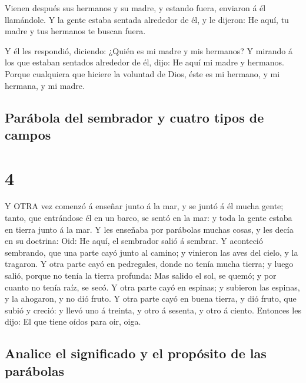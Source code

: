  Vienen después sus hermanos y su madre, y estando fuera,
enviaron á él llamándole.  Y la gente estaba sentada
alrededor de él, y le dijeron: He aquí, tu madre y tus hermanos te
buscan fuera.

 Y él les respondió, diciendo: ¿Quién es mi madre y mis
hermanos?  Y mirando á los que estaban sentados alrededor
de él, dijo: He aquí mi madre y hermanos.  Porque
cualquiera que hiciere la voluntad de Dios, éste es mi hermano, y mi
hermana, y mi madre.

\hypertarget{paruxe1bola-del-sembrador-y-cuatro-tipos-de-campos}{%
\subsection{Parábola del sembrador y cuatro tipos de
campos}\label{paruxe1bola-del-sembrador-y-cuatro-tipos-de-campos}}

\hypertarget{section-3}{%
\section{4}\label{section-3}}

 Y OTRA vez comenzó á enseñar junto á la mar, y se juntó á
él mucha gente; tanto, que entrándose él en un barco, se sentó en la
mar: y toda la gente estaba en tierra junto á la mar.  Y les
enseñaba por parábolas muchas cosas, y les decía en su doctrina:
 Oid: He aquí, el sembrador salió á sembrar.  Y
aconteció sembrando, que una parte cayó junto al camino; y vinieron las
aves del cielo, y la tragaron.  Y otra parte cayó en
pedregales, donde no tenía mucha tierra; y luego salió, porque no tenía
la tierra profunda:  Mas salido el sol, se quemó; y por
cuanto no tenía raíz, se secó.  Y otra parte cayó en
espinas; y subieron las espinas, y la ahogaron, y no dió fruto.
 Y otra parte cayó en buena tierra, y dió fruto, que subió y
creció: y llevó uno á treinta, y otro á sesenta, y otro á ciento.
 Entonces les dijo: El que tiene oídos para oir, oiga.

\hypertarget{analice-el-significado-y-el-propuxf3sito-de-las-paruxe1bolas}{%
\subsection{Analice el significado y el propósito de las
parábolas}\label{analice-el-significado-y-el-propuxf3sito-de-las-paruxe1bolas}}

